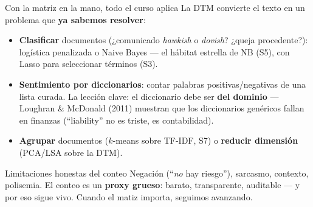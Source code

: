 \documentclass{beamer}
\newcommand{\1}{\mathbb{I}}
\begin{document}
\begin{frame}{Con la matriz en la mano, todo el curso aplica}
\small
La DTM convierte el texto en un problema que \textbf{ya sabemos resolver}:
\begin{itemize}\itemsep5pt
  \item \textbf{Clasificar} documentos (¿comunicado \emph{hawkish} o \emph{dovish}? ¿queja procedente?): logística penalizada o Naive Bayes --- el hábitat estrella de NB (S5), con Lasso para seleccionar términos (S3). \pause
  \item \textbf{Sentimiento por diccionarios}: contar palabras positivas/negativas de una lista curada. La lección clave: el diccionario debe ser \textbf{del dominio} --- Loughran \& McDonald (2011) muestran que los diccionarios genéricos fallan en finanzas (``liability'' no es triste, es contabilidad). \pause
  \item \textbf{Agrupar} documentos ($k$-means sobre TF-IDF, S7) o \textbf{reducir dimensión} (PCA/LSA sobre la DTM). \pause
\end{itemize}

\vspace{0.1cm}
\begin{block}{Limitaciones honestas del conteo}
Negación (``\emph{no} hay riesgo''), sarcasmo, contexto, polisemia. El conteo es un \textbf{proxy grueso}: barato, transparente, auditable --- y por eso sigue vivo. Cuando el matiz importa, seguimos avanzando.
\end{block}
\end{frame}
\end{document}
